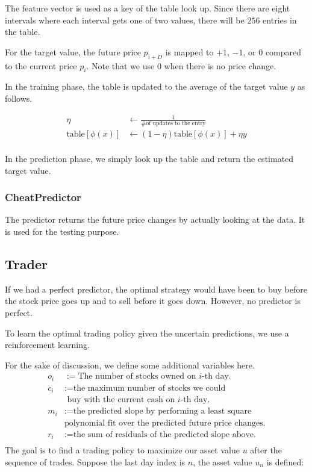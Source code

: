 \documentclass[twocolumn,10pt]{asme2ej}
\begin{document}
The feature vector is used as a key of the table look up. Since there
are eight intervals where each interval gets one of two values, there
will be $256$ entries in the table.

For the target value, the future price $p_{i+D}$ is mapped to $+1$,
$-1$, or $0$ compared to the current price $p_i$. Note that we use $0$
when there is no price change.

In the training phase, the table is updated to the average of the
target value $y$ as follows.

\begin{align*}
  \eta &\gets \frac{1}{\text{\# of updates to the entry}} \\
  \text{table}[\phi(x)] &\gets (1 - \eta)\text{table}[\phi(x)] + \eta y \\
\end{align*}

In the prediction phase, we simply look up the table and return the
estimated target value.

\subsubsection{CheatPredictor}

The predictor returns the future price changes by actually looking at the
data. It is used for the testing purpose.

\subsection{Trader}

If we had a perfect predictor, the optimal strategy would have been to
buy before the stock price goes up and to sell before it goes
down. However, no predictor is perfect.

To learn the optimal trading policy given the uncertain predictions,
we use a reinforcement learning.

For the sake of discussion, we define some additional variables here.
\begin{align*}
  o_i &:= \text{The number of stocks owned on }i\text{-th day.} \\
  c_i &:= \text{the maximum number of stocks we could}\\
  & \text{ buy with the current cash on }i\text{-th day.} \\
  m_i &:= \text{the predicted slope by performing a least square} \\
  & \text{polynomial fit over the predicted future price changes.} \\
  r_i &:= \text{the sum of residuals of the predicted slope above.} \\
\end{align*}
The goal is to find a trading policy to maximize our asset value $u$
after the sequence of trades. Suppose the last day index is $n$, the
asset value $u_n$ is defined:
\end{document}
